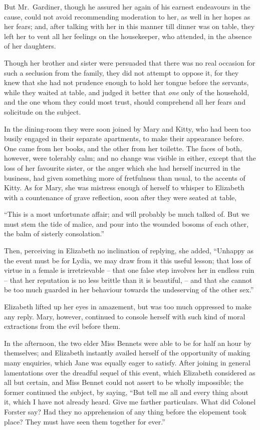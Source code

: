 But Mr.\ Gardiner, though he assured her again of his
earnest endeavours in the cause, could not avoid recommending
moderation to her, as well in her hopes as her
fears; and, after talking with her in this manner till
dinner was on table, they left her to vent all her feelings
on the housekeeper, who attended, in the absence of her
daughters.

Though her brother and sister were persuaded that
there was no real occasion for such a seclusion from the
family, they did not attempt to oppose it, for they knew
that she had not prudence enough to hold her tongue
before the servants, while they waited at table, and
judged it better that \textit{one} only of the household, and the
one whom they could most trust, should comprehend all
her fears and solicitude on the subject.

In the dining-room they were soon joined by Mary and
Kitty, who had been too busily engaged in their separate
apartments, to make their appearance before. One came
from her books, and the other from her toilette. The
faces of both, however, were tolerably calm; and no
change was visible in either, except that the loss of her
favourite sister, or the anger which she had herself incurred
in the business, had given something more of fretfulness
than usual, to the accents of Kitty. As for Mary, she was
mistress enough of herself to whisper to Elizabeth with
a countenance of grave reflection, soon after they were
seated at table,

“This is a most unfortunate affair; and will probably
be much talked of. But we must stem the tide of malice,
and pour into the wounded bosoms of each other, the
balm of sisterly consolation.”

Then, perceiving in Elizabeth no inclination of replying,
she added, “Unhappy as the event must be for Lydia,
we may draw from it this useful lesson; that loss of
virtue in a female is irretrievable -- that one false step
involves her in endless ruin -- that her reputation is no
less brittle than it is beautiful, -- and that she cannot be
too much guarded in her behaviour towards the undeserving
of the other sex.”

Elizabeth lifted up her eyes in amazement, but was too
much oppressed to make any reply. Mary, however,
continued to console herself with such kind of moral
extractions from the evil before them.

In the afternoon, the two elder Miss Bennets were able
to be for half an hour by themselves; and Elizabeth
instantly availed herself of the opportunity of making many
enquiries, which Jane was equally eager to satisfy. After
joining in general lamentations over the dreadful sequel
of this event, which Elizabeth considered as all but
certain, and Miss Bennet could not assert to be wholly
impossible; the former continued the subject, by saying,
“But tell me all and every thing about it, which I have
not already heard. Give me farther particulars. What
did Colonel Forster say? Had they no apprehension of
any thing before the elopement took place? They must
have seen them together for ever.”

